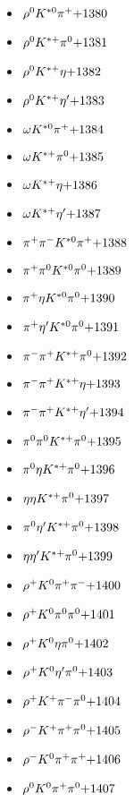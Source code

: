 \begin{multicols}{3}
\begin{itemize}
 \item $ \rho^{0} K^{*0} \pi^{+} \hfill{+1380}$
 \item $ \rho^{0} K^{*+} \pi^{0} \hfill{+1381}$
 \item $ \rho^{0} K^{*+} \eta \hfill{+1382}$
 \item $ \rho^{0} K^{*+} {\eta^{\prime}} \hfill{+1383}$
 \item $ \omega K^{*0} \pi^{+} \hfill{+1384}$
 \item $ \omega K^{*+} \pi^{0} \hfill{+1385}$
 \item $ \omega K^{*+} \eta \hfill{+1386}$
 \item $ \omega K^{*+} {\eta^{\prime}} \hfill{+1387}$
 \item $ \pi^{+} \pi^{-} K^{*0} \pi^{+} \hfill{+1388}$
 \item $ \pi^{+} \pi^{0} K^{*0} \pi^{0} \hfill{+1389}$
 \item $ \pi^{+} \eta K^{*0} \pi^{0} \hfill{+1390}$
 \item $ \pi^{+} {\eta^{\prime}} K^{*0} \pi^{0} \hfill{+1391}$
 \item $ \pi^{-} \pi^{+} K^{*+} \pi^{0} \hfill{+1392}$
 \item $ \pi^{-} \pi^{+} K^{*+} \eta \hfill{+1393}$
 \item $ \pi^{-} \pi^{+} K^{*+} {\eta^{\prime}} \hfill{+1394}$
 \item $ \pi^{0} \pi^{0} K^{*+} \pi^{0} \hfill{+1395}$
 \item $ \pi^{0} \eta K^{*+} \pi^{0} \hfill{+1396}$
 \item $ \eta \eta K^{*+} \pi^{0} \hfill{+1397}$
 \item $ \pi^{0} {\eta^{\prime}} K^{*+} \pi^{0} \hfill{+1398}$
 \item $ \eta {\eta^{\prime}} K^{*+} \pi^{0} \hfill{+1399}$
 \item $ \rho^{+} K^{0} \pi^{+} \pi^{-} \hfill{+1400}$
 \item $ \rho^{+} K^{0} \pi^{0} \pi^{0} \hfill{+1401}$
 \item $ \rho^{+} K^{0} \eta \pi^{0} \hfill{+1402}$
 \item $ \rho^{+} K^{0} {\eta^{\prime}} \pi^{0} \hfill{+1403}$
 \item $ \rho^{+} K^{+} \pi^{-} \pi^{0} \hfill{+1404}$
 \item $ \rho^{-} K^{+} \pi^{+} \pi^{0} \hfill{+1405}$
 \item $ \rho^{-} K^{0} \pi^{+} \pi^{+} \hfill{+1406}$
 \item $ \rho^{0} K^{0} \pi^{+} \pi^{0} \hfill{+1407}$

\end{itemize}
\end{multicols}

